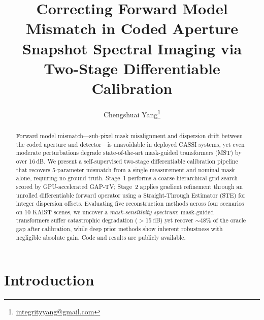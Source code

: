 \documentclass[runningheads]{llncs}
\begin{document}
\title{Correcting Forward Model Mismatch in Coded Aperture Snapshot Spectral Imaging via Two-Stage Differentiable Calibration}

\author{Chengshuai Yang\thanks{\href{mailto:integrityyang@gmail.com}{integrityyang@gmail.com}}}

\maketitle

\begin{abstract}
Forward model mismatch---sub-pixel mask misalignment and dispersion drift between the coded aperture and detector---is unavoidable in deployed CASSI systems, yet even moderate perturbations degrade state-of-the-art mask-guided transformers (MST) by over 16\,dB.
We present a self-supervised two-stage differentiable calibration pipeline that recovers 5-parameter mismatch from a single measurement and nominal mask alone, requiring no ground truth.
Stage~1 performs a coarse hierarchical grid search scored by GPU-accelerated GAP-TV; Stage~2 applies gradient refinement through an unrolled differentiable forward operator using a Straight-Through Estimator (STE) for integer dispersion offsets.
Evaluating five reconstruction methods across four scenarios on 10 KAIST scenes, we uncover a \emph{mask-sensitivity spectrum}: mask-guided transformers suffer catastrophic degradation ($>$15\,dB) yet recover ${\sim}48$\% of the oracle gap after calibration, while deep prior methods show inherent robustness with negligible absolute gain.
Code and results are publicly available.

\end{abstract}

\section{Introduction}
\label{sec:intro}
\end{document}

